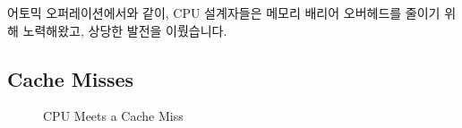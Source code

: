 어토믹 오퍼레이션에서와 같이, CPU 설계자들은 메모리 배리어 오버헤드를 줄이기
위해 노력해왔고, 상당한 발전을 이뤘습니다.

\subsection{Cache Misses}
\label{sec:cpu:Cache Misses}

\begin{figure}[tb]
\centering
{}
\caption{CPU Meets a Cache Miss}
\end{figure}

